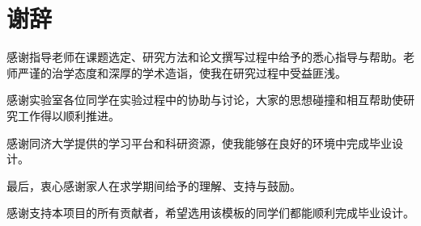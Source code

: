 \chapter*{谢辞}

感谢指导老师在课题选定、研究方法和论文撰写过程中给予的悉心指导与帮助。老师严谨的治学态度和深厚的学术造诣，使我在研究过程中受益匪浅。

感谢实验室各位同学在实验过程中的协助与讨论，大家的思想碰撞和相互帮助使研究工作得以顺利推进。

感谢同济大学提供的学习平台和科研资源，使我能够在良好的环境中完成毕业设计。

最后，衷心感谢家人在求学期间给予的理解、支持与鼓励。

感谢支持本项目的所有贡献者，希望选用该模板的同学们都能顺利完成毕业设计。
